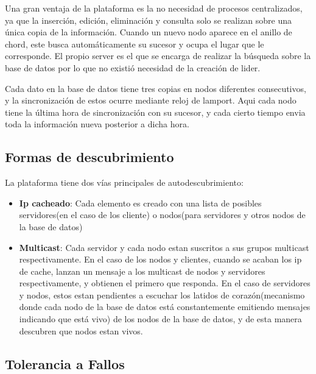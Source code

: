 \documentclass[11pt]{article}
\begin{document}
    Una gran ventaja de la plataforma es la no necesidad de procesos centralizados, ya que la inserción, 
    edición, eliminación y consulta solo se realizan sobre una única copia de la información. Cuando un 
    nuevo nodo aparece en el anillo de chord, este busca automáticamente su sucesor y ocupa el lugar que 
    le corresponde. El propio server es el que se encarga de realizar la búsqueda sobre la base de datos 
    por lo que no existió necesidad de la creación de lider.

    Cada dato en la base de datos tiene tres copias en nodos diferentes consecutivos, y la sincronización de 
    estos ocurre mediante reloj de lamport. Aqui cada nodo tiene la última hora de sincronización con su 
    sucesor, y cada cierto tiempo envia toda la información nueva posterior a dicha hora.

    \newpage

    \subsection{Formas de descubrimiento}

    La plataforma tiene dos vías principales de autodescubrimiento:
    \begin{itemize}
        \item \textbf{Ip cacheado}: Cada elemento es creado con una lista de posibles servidores(en 
        el caso de los cliente) o nodos(para servidores y otros nodos de la base de datos)

        \item \textbf{Multicast}: Cada servidor y cada nodo estan suscritos a sus grupos multicast 
        respectivamente. En el caso de los nodos y clientes, cuando se acaban los ip de cache, lanzan 
        un mensaje a los multicast de nodos y servidores respectivamente, y obtienen el primero que 
        responda. En el caso de servidores y nodos, estos estan pendientes a escuchar los latidos de 
        corazón(mecanismo donde cada nodo de la base de datos está constantemente emitiendo mensajes 
        indicando que está vivo) de los nodos de la base de datos, y de esta manera descubren que nodos 
        estan vivos.
    \end{itemize}

    \newpage

    \subsection{Tolerancia a Fallos}
\end{document}
